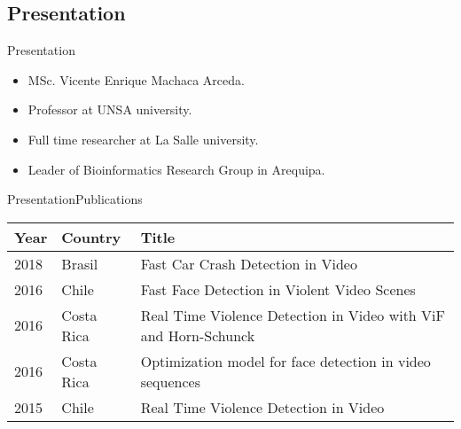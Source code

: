 \documentclass[10pt]{beamer}
\newcommand{\1}{
        	\setbeamertemplate{background}{
        		\texttt{[image: img/1]}
        		\tikz[overlay] \fill[fill opacity=0.75,fill=white] (0,0) rectangle (-\paperwidth,\paperheight);
        	}
}
\begin{document}
\subsection{Presentation}

\begin{frame}{Presentation}{}
	\begin{itemize}
		\item<1-> MSc. Vicente Enrique Machaca Arceda. 
		\item<2-> Professor at UNSA university.
		\item<3-> Full time researcher at La Salle university.		
		\item<4-> Leader of Bioinformatics Research Group  in Arequipa.
	\end{itemize}
\end{frame}

\begin{frame}{Presentation}{Publications}
	\begin{table}[]
		\setlength{\tabcolsep}{0.5em} %
		{\renewcommand{\arraystretch}{1.4}%
		\begin{tabular}{llp{7cm}}
			\textbf{Year} & \textbf{Country} & \textbf{Title}                                                                                                              \\
			\hline
		
			2018          & Brasil           & Fast Car Crash Detection in Video                                                                                           \\
			2016          & Chile            & Fast Face Detection in Violent Video Scenes                                                                                 \\
			2016          & Costa Rica       & Real Time Violence Detection in Video with ViF and Horn-Schunck                                                             \\
			2016          & Costa Rica       & Optimization model for face detection in video sequences                                                                    \\
			2015          & Chile            & Real Time Violence Detection in Video                                                                                      
		\end{tabular}
	}
	\end{table}
\end{frame}
\end{document}
